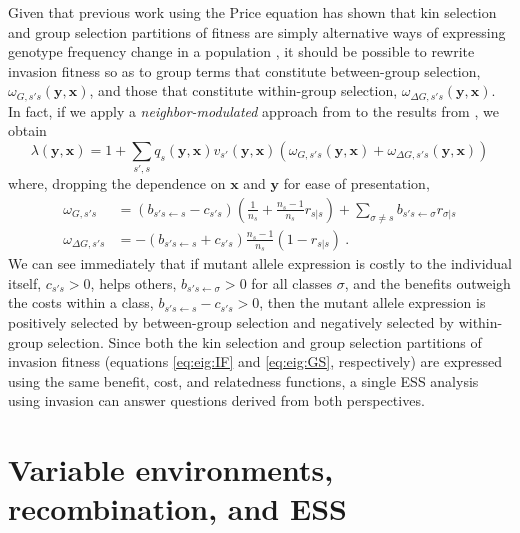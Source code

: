 \documentclass[11pt]{article}
\renewcommand{\vec}[1]{\symbf{#1}}
\newcommand{\eig}{\lambda}
\begin{document}
Given that previous work using the Price equation has shown that kin selection and group selection partitions of fitness are simply alternative ways of expressing genotype frequency change in a population \cite{Queller:1992,Bijma:Wade:2008,Gardner:West:2007,Marshall:2011,Akcay:VanCleve:2012}, it should be possible to rewrite invasion fitness so as to group terms that constitute between-group selection, $\omega_{G,s'\!s}(\vec{y}, \vec{x})$, and those that constitute within-group selection, $\omega_{\Delta G,s'\!s}(\vec{y}, \vec{x})$. In fact, if we apply a \textit{neighbor-modulated} approach from \cite{Queller:1992,Akcay:VanCleve:2012} to the results from \cite{Lehmann:Rousset:2020}, we obtain
\begin{equation}
  \label{eq:eig:GS}
  \eig(\vec{y}, \vec{x}) = 1 + \sum_{s'\!,s} q_{s}(\vec{y}, \vec{x}) v_{s'}(\vec{y}, \vec{x})
  \left( \omega_{G,s'\!s}(\vec{y}, \vec{x}) + \omega_{\Delta G,s'\!s}(\vec{y}, \vec{x}) \right)
\end{equation}
where, dropping the dependence on $\vec{x}$ and $\vec{y}$ for ease of presentation,
\begin{equation}
  \label{eq:wg:wdeltag}
  \begin{split}
    \omega_{G,s'\!s} & = \left(b_{s'\!s \leftarrow s} - c_{s'\!s} \right) \left(\frac{1}{n_{s}} + \frac{n_{s}-1}{n_{s}} r_{s|s} \right) + \sum_{\sigma \ne s} b_{s'\!s \leftarrow \sigma} r_{\sigma|s} \\
    \omega_{\Delta G,s'\!s} & = - \left(b_{s'\!s \leftarrow s} + c_{s'\!s}\right) \frac{n_{s}-1}{n_{s}} \left( 1 - r_{s|s} \right) \: .
  \end{split}
\end{equation}
We can see immediately that if mutant allele expression is costly to the individual itself, $c_{s'\!s}>0$, helps others, $b_{s'\!s \leftarrow \sigma}>0$ for all classes $\sigma$, and the benefits outweigh the costs within a class, $b_{s'\!s \leftarrow s} - c_{s'\!s}>0$, then the mutant allele expression is positively selected by between-group selection and negatively selected by within-group selection. Since both the kin selection and group selection partitions of invasion fitness (equations \eqref{eq:eig:IF} and \eqref{eq:eig:GS}, respectively) are expressed using the same benefit, cost, and relatedness functions, a single ESS analysis using invasion can answer questions derived from both perspectives.

\section{Variable environments, recombination, and ESS}
\end{document}
